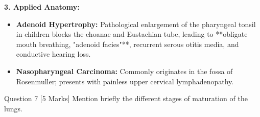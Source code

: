 \documentclass[11pt,a4paper]{article}
\begin{document}
\begin{ansbox}
\textbf{3. Applied Anatomy:}
\begin{itemize}[leftmargin=*]
    \item \textbf{Adenoid Hypertrophy:} Pathological enlargement of the pharyngeal tonsil in children blocks the choanae and Eustachian tube, leading to **obligate mouth breathing, "adenoid facies"**, recurrent serous otitis media, and conductive hearing loss.
    \item \textbf{Nasopharyngeal Carcinoma:} Commonly originates in the fossa of Rosenmuller; presents with painless upper cervical lymphadenopathy.
\end{itemize}
\end{ansbox}

\begin{qbox}{Question 7 [5 Marks]}
Mention briefly the different stages of maturation of the lungs.
\end{qbox}
\end{document}
